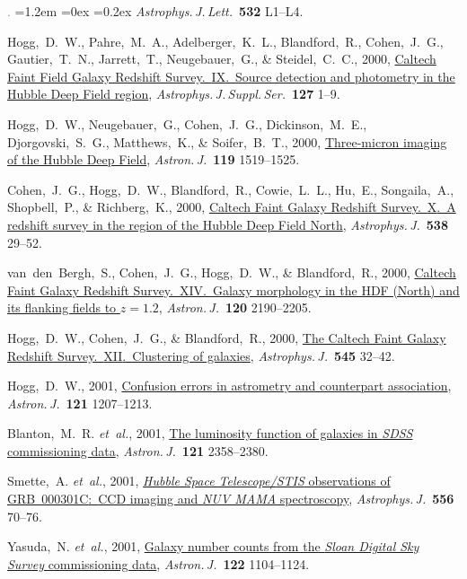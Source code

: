 \documentclass[10pt,letterpaper]{article}
\newcommand{\acronym}[1]{{\small{#1}}}
\newcommand{\foreign}[1]{\textsl{#1}}
\newcommand{\etal}{\foreign{et~al.}}
\newcommand{\project}[1]{\textsl{#1}}
\newcommand{\doi}[2]{\href{http://dx.doi.org/#1}{{#2}}}
\newcommand{\deemph}[1]{\textcolor{grey}{\footnotesize{#1}}}
\newcommand{\pubnumber}[1]{\deemph{{#1}.}}
\newcounter{refpubnum}
\newcommand{\hogglist}{%
    \rightmargin=0in
    \leftmargin=1.2em
    \topsep=0ex
    \partopsep=0pt
    \itemsep=0.2ex
    \parsep=0pt
    \itemindent=-1.0\leftmargin
    \listparindent=0.0\leftmargin
    \settowidth{\labelsep}{~}
    \usecounter{refpubnum}
  }
\begin{document}
\begin{list}{\pubnumber{\therefpubnum}}{\hogglist}
\textit{Astrophys.\,J.\,Lett.}\ \textbf{532} L1--L4.
\item
Hogg,~D.~W., Pahre,~M.~A., Adelberger,~K.~L., Blandford,~R., Cohen,~J.~G., Gautier,~T.~N., Jarrett,~T., Neugebauer,~G., \& Steidel,~C.~C., 2000,
\doi{10.1086/313318}{Caltech Faint Field Galaxy Redshift Survey.\ \acronym{IX}.\ Source detection and photometry in the Hubble Deep Field region},
\textit{Astrophys.\,J.\,Suppl.\,Ser.}\ \textbf{127} 1--9.
\item
Hogg,~D.~W., Neugebauer,~G., Cohen,~J.~G., Dickinson,~M.~E., Djorgovski,~S.~G., Matthews,~K., \& Soifer,~B.~T., 2000,
\doi{10.1086/301309}{Three-micron imaging of the Hubble Deep Field},
\textit{Astron.\,J.}\ \textbf{119} 1519--1525.
\item\label{pub:Cohen2000}
Cohen,~J.~G., Hogg,~D.~W., Blandford,~R., Cowie,~L.~L., Hu,~E., Songaila,~A., Shopbell,~P., \& Richberg,~K., 2000,
\doi{10.1086/309096}{Caltech Faint Galaxy Redshift Survey.\ \acronym{X}.\ A redshift survey in the region of the Hubble Deep Field North},
\textit{Astrophys.\,J.}\ \textbf{538} 29--52.
\item
van~den~Bergh,~S., Cohen,~J.~G., Hogg,~D.~W., \& Blandford,~R., 2000,
\doi{10.1086/316828}{Caltech Faint Galaxy Redshift Survey.\ \acronym{XIV}.\ Galaxy morphology in the HDF (North) and its flanking fields to $z=1.2$},
\textit{Astron.\,J.}\ \textbf{120} 2190--2205.
\item
Hogg,~D.~W., Cohen,~J.~G., \& Blandford,~R., 2000,
\doi{10.1086/317779}{The Caltech Faint Galaxy Redshift Survey.\ \acronym{XII}.\ Clustering of galaxies},
\textit{Astrophys.\,J.}\ \textbf{545} 32--42.
\item
Hogg,~D.~W., 2001,
\doi{10.1086/318736}{Confusion errors in astrometry and counterpart association},
\textit{Astron.\,J.}\ \textbf{121} 1207--1213.
\item
Blanton,~M.~R. \etal, 2001,
\doi{10.1086/320405}{The luminosity function of galaxies in \project{\acronym{SDSS}} commissioning data},
\textit{Astron.\,J.}\ \textbf{121} 2358--2380.
\item
Smette,~A. \etal, 2001,
\doi{10.1086/321585}{\project{Hubble Space Telescope/\acronym{STIS}} observations of \acronym{GRB~000301C}:\ \acronym{CCD} imaging and \project{\acronym{NUV MAMA}} spectroscopy},
\textit{Astrophys.\,J.}\ \textbf{556} 70--76.
\item
Yasuda,~N. \etal, 2001,
\doi{10.1086/322093}{Galaxy number counts from the \project{Sloan Digital Sky Survey} commissioning data},
\textit{Astron.\,J.}\ \textbf{122} 1104--1124.
\item\label{pub:Hogg2001}

\end{list}
\end{document}
